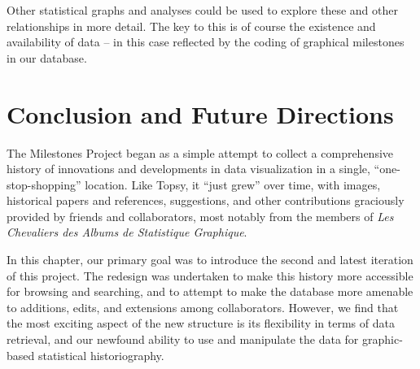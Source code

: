 \documentclass[11pt]{article}
\begin{document}
Other statistical graphs and analyses could be used to explore these and other relationships in more detail. The key to this is of course the existence and availability of data -- in this case reflected by the coding of graphical milestones in our database.

\section{Conclusion and Future Directions}
The Milestones Project began as a simple attempt to collect a comprehensive history of innovations and developments in data visualization in a single, ``one-stop-shopping'' location. Like Topsy, it ``just grew'' over time, with images, historical papers and references, suggestions, and other contributions graciously provided by friends and collaborators, most notably from the members of \emph{Les Chevaliers des Albums de Statistique Graphique}.

In this chapter, our primary goal was to introduce the second and latest iteration of this project.  The redesign was undertaken to make this history more accessible for browsing and searching, and to attempt to make the database more amenable to additions, edits, and extensions among collaborators.  However, we find that the most exciting aspect of the new structure is its flexibility in terms of data retrieval, and our newfound ability to use and manipulate the data for graphic-based statistical historiography.

%
\end{document}
